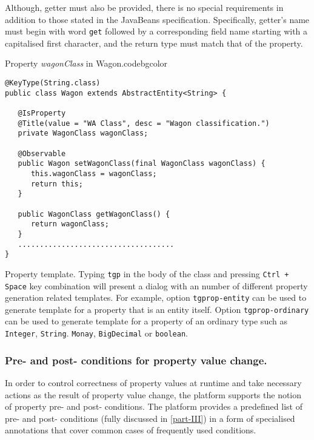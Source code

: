   Although, getter must also be provided, there is no special requirements in addition to those stated in the JavaBeans specification.
  Specifically, getter's name must begin with word \texttt{get} followed by a corresponding field name starting with a capitalised first character, and the return type must match that of the property.

  \begin{code}{Property \emph{wagonClass} in Wagon.}{\label{lst:WagonWagonClassProperty}}{codebgcolor}
    \begin{lstlisting}
@KeyType(String.class)
public class Wagon extends AbstractEntity<String> {

   @IsProperty
   @Title(value = "WA Class", desc = "Wagon classification.")
   private WagonClass wagonClass;

   @Observable
   public Wagon setWagonClass(final WagonClass wagonClass) {
      this.wagonClass = wagonClass;
      return this;
   }
  
   public WagonClass getWagonClass() {
      return wagonClass;
   }
   ....................................
}
    \end{lstlisting}
  \end{code}


  \begin{notebox}{Property template.}{\label{nb:EclipseTemplatesForProperty}}
    Typing \texttt{tgp} in the body of the class and pressing \texttt{Ctrl + Space} key combination will present a dialog with an number of different property generation related templates. 
    For example, option \texttt{tgprop-entity} can be used to generate template for a property that is an entity itself.
    Option \texttt{tgprop-ordinary} can be used to generate template for a property of an ordinary type such as \texttt{Integer}, \texttt{String}. \texttt{Monay}, \texttt{BigDecimal} or \texttt{boolean}.
  \end{notebox}

  \subsubsection*{Pre- and post- conditions for property value change.}
  
  In order to control correctness of property values at runtime and take necessary actions as the result of property value change, the platform supports the notion of property pre- and post- conditions.
  The platform provides a predefined list of pre- and post- conditions (fully discussed in \ref{part-III}) in a form of specialised annotations that cover common cases of frequently used conditions.
  
